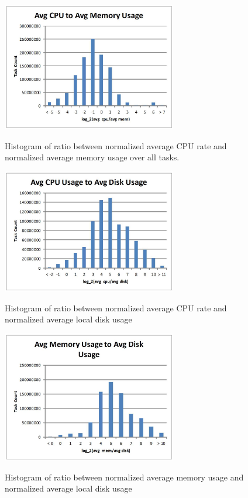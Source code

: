 \documentclass{sig-alternate}
\begin{document}

\begin{figure}[t]
\centering
\includegraphics[width=3in]{../figures/avg_act_cpu_mem.jpg}
\label{avg_act_cpu_mem}
\caption{Histogram of ratio between normalized average CPU rate and normalized average memory usage over all tasks.}
\end{figure}

\begin{figure}[t]
\centering
\includegraphics[width=3in]{../figures/avg_act_cpu_disk.jpg}
\label{avg_act_cpu_disk}
\caption{Histogram of ratio between normalized average CPU rate and normalized average local disk usage}
\end{figure}

\begin{figure}[t]
\centering
\includegraphics[width=3in]{../figures/avg_act_mem_disk.jpg}
\label{avg_act_mem_disk}
\caption{Histogram of ratio between normalized average memory usage and normalized average local disk usage}
\end{figure}
\end{document}
